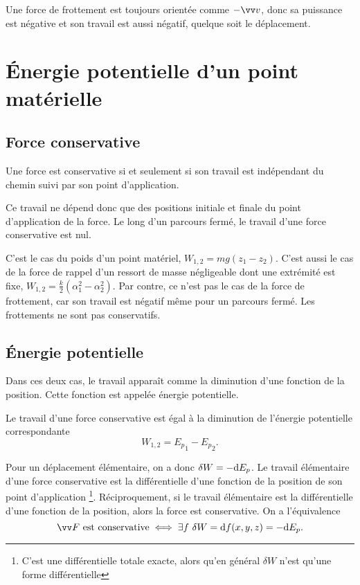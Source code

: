 Une force de frottement est toujours orientée comme $-\vvv$, donc sa puissance est négative et son travail est aussi négatif, quelque soit le déplacement.

\section{Énergie potentielle d'un point matérielle}
\label{chap4-sec:energiepotentielle}
\subsection{Force conservative}
\label{chap4-subsec:forceconservative}
\begin{defdef}
  Une force est conservative si et seulement si son travail est indépendant du chemin suivi par son point d'application.
\end{defdef}

Ce travail ne dépend donc que des positions initiale et finale du point d'application de la force. Le long d'un parcours fermé, le travail d'une force conservative est nul.

C'est le cas du poids d'un point matériel, $W_{1,2}=mg(z_1-z_2)$. C'est aussi le cas de la force de rappel d'un ressort de masse négligeable dont une extrémité est fixe, $W_{1, 2} = \frac{k}{2}(\alpha_1^2 - \alpha_2^2)$. Par contre, ce n'est pas le cas de la force de frottement, car son travail est négatif même pour un parcours fermé. Les frottements ne sont pas conservatifs.

\subsection{Énergie potentielle}
\label{chap4-subsec:energiepotentielle}

Dans ces deux cas, le travail apparaît comme la diminution d'une fonction de la position. Cette fonction est appelée énergie potentielle.
\begin{defdef}
  Le travail d'une force conservative est égal à la diminution de l'énergie potentielle correspondante
  \begin{equation}
    W_{1, 2}={E_p}_1 -{E_p}_2.
  \end{equation}
\end{defdef}
Pour un déplacement élémentaire, on a donc $\delta W = -\mathrm{d} E_p$. Le travail élémentaire d'une force conservative est la différentielle d'une fonction de la position de son point d'application \footnote{C'est une différentielle totale exacte, alors qu'en général $\delta W$ n'est qu'une forme différentielle}. Réciproquement, si le travail élémentaire est la différentielle d'une fonction de la position, alors la force est conservative. On a l'équivalence
\begin{equation}
  \vF \text{~est conservative} \iff \exists f \ \delta W = \D f(x,y,z) = -\D E_p.
\end{equation}

